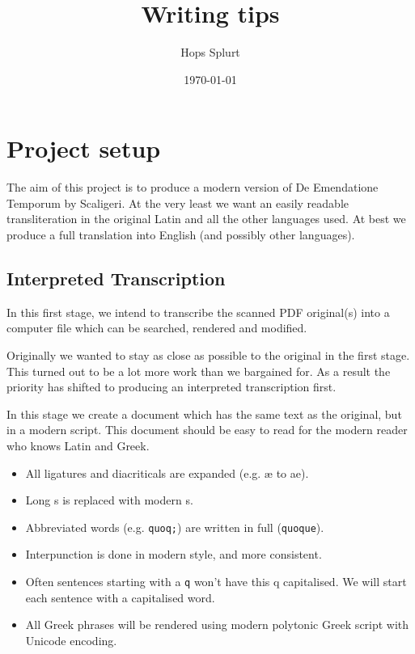 \documentclass{report}
\title{Writing tips}
\author{Hops Splurt}
\date{\today}                                           %
\begin{document}
\maketitle

\tableofcontents{}




\chapter{Project setup}
The aim of this project is to produce a modern version of
De Emendatione Temporum by Scaligeri.
At the very least we want an easily readable transliteration
in the original Latin and all the other languages used.
At best we produce
a full translation into English (and possibly other languages).

\section{Interpreted Transcription}
In this first stage, we intend to transcribe the scanned PDF original(s)
into a computer file which can be searched, rendered
and modified.

Originally we wanted to stay as close as possible to the original
in the first stage.
This turned out to be a lot more work than we bargained for.
As a result the priority has shifted to producing
an interpreted transcription first.

In this stage we create a document which has the same text as the original,
but in a modern script.
This document should be easy to read for the modern reader who knows
Latin and Greek.

\begin{itemize}
\item All ligatures and diacriticals are expanded (e.g. æ to ae).
\item Long s is replaced with modern s.
\item Abbreviated words (e.g. \verb+quoq;+) are written in full (\verb+quoque+).
\item Interpunction is done in modern style, and more consistent.
\item Often sentences starting with a \verb+q+ won't have this q capitalised.
We will start each sentence with a capitalised word.
\item All Greek phrases will be rendered using modern polytonic Greek
script with Unicode encoding.
\end{itemize}
\end{document}

